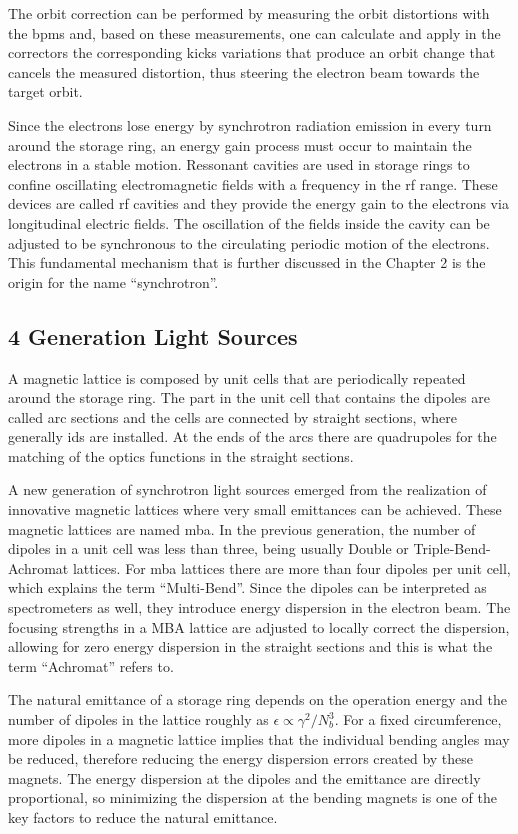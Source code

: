 The orbit correction can be performed by measuring the orbit distortions with the \glspl{bpm} and, based on these measurements, one can calculate and apply in the correctors the corresponding kicks variations that produce an orbit change that cancels the measured distortion, thus steering the electron beam towards the target orbit.

Since the electrons lose energy by synchrotron radiation emission in every turn around the storage ring, an energy gain process must occur to maintain the electrons in a stable motion. Ressonant cavities are used in storage rings to confine oscillating electromagnetic fields with a frequency in the \gls{rf} range. These devices are called \gls{rf} cavities and they provide the energy gain to the electrons via longitudinal electric fields. The oscillation of the fields inside the cavity can be adjusted to be synchronous to the circulating periodic motion of the electrons. This fundamental mechanism that is further discussed in the Chapter 2 is the origin for the name ``synchrotron''. 
\subsection{4 Generation Light Sources}\label{subsec:fourth_generation}
A magnetic lattice is composed by unit cells that are periodically repeated around the storage ring. The part in the unit cell that contains the dipoles are called arc sections and the cells are connected by straight sections, where generally \glspl{id} are installed. At the ends of the arcs there are quadrupoles for the matching of the optics functions in the straight sections.

A new generation of synchrotron light sources emerged from the realization of innovative magnetic lattices where very small emittances can be achieved. These magnetic lattices are named \gls{mba}. In the previous generation, the number of dipoles in a unit cell was less than three, being usually Double or Triple-Bend-Achromat lattices. For \gls{mba} lattices there are more than four dipoles per unit cell, which explains the term ``Multi-Bend''. Since the dipoles can be interpreted as spectrometers as well, they introduce energy dispersion in the electron beam. The focusing strengths in a MBA lattice are adjusted to locally correct the dispersion, allowing for zero energy dispersion in the straight sections and this is what the term ``Achromat'' refers to. 

The natural emittance of a storage ring depends on the operation energy and the number of dipoles in the lattice roughly as $\epsilon \propto \gamma^2/N_{b}^3$. For a fixed circumference, more dipoles in a magnetic lattice implies that the individual bending angles may be reduced, therefore reducing the energy dispersion errors created by these magnets. The energy dispersion at the dipoles and the emittance are directly proportional, so minimizing the dispersion at the bending magnets is one of the key factors to reduce the natural emittance.


